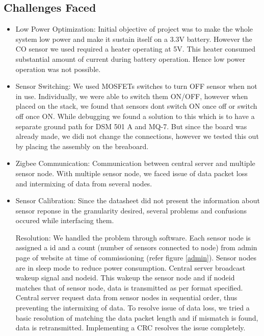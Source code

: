 \documentclass[a4paper,12pt]{article}
\begin{document}
\subsection{Challenges Faced}

\begin{itemize}
\item Low Power Optimization: Initial objective of project was to make the whole system low power and make it sustain itself on a 3.3V battery. However the CO sensor we used required a heater operating at 5V. This heater consumed substantial amount of current during battery operation. Hence low power operation was not possible.

\item Sensor Switching: We used MOSFETs switches to turn OFF sensor when not in use. Individually, we were able to switch them ON/OFF, however when placed on the stack, we found that sensors dont switch ON once off or switch off once ON. While debugging we found a solution to this which is to have a separate ground path for DSM 501 A and MQ-7. But since the board was already made, we didi not change the connections, however we tested this out by placing the assembly on the breaboard.

\item Zigbee Communication: Communication between central server and multiple sensor node. With multiple sensor node, we faced issue of data packet loss and intermixing of data from several nodes.

\item Sensor Calibration: Since the datasheet did not present the information about sensor reponse in the granularity desired, several problems and confusions occured while interfacing them.

Resolution: We handled the problem through software. Each sensor node is assigned a id and a count (number of sensors connected to node) from admin page of website at time of commissioning (refer figure \ref{admin}). Sensor nodes are in sleep mode to reduce power consumption. Central server broadcast wakeup signal and nodeid. This wakeup the sensor node and if nodeid matches that of sensor node, data is transmitted as per format specified. Central server request data from sensor nodes in sequential order, thus preventing the intermixing of data. To resolve issue of data loss, we tried a basic resolution of matching the data packet length and if mismatch is found, data is retransmitted. Implementing a CRC resolves the issue completely.


\end{itemize}
\end{document}
